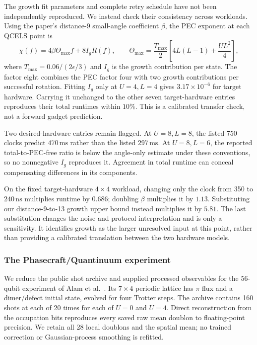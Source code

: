 \documentclass[11pt]{article}
\newcommand{\eps}{\epsilon}
\begin{document}
The growth fit parameters and complete retry schedule have not been
independently reproduced. We instead check their consistency across workloads.
Using the paper's distance-9 small-angle coefficient $\beta$, the PEC
exponent at each QCELS point is
\begin{equation}\label{eq:published-pec}
 \chi(f)=4\beta\Theta_{\max}f+8I_gR(f),\qquad
 \Theta_{\max}=\frac{T_{\max}}{2}
 \left[4L(L-1)+\frac{UL^2}{4}\right],
\end{equation}
where $T_{\max}=0.06/(2\eps/3)$ and $I_g$ is the growth contribution per
state. The factor eight combines the PEC factor four with two growth
contributions per successful rotation. Fitting $I_g$ only at $U=4,L=4$
gives $3.17\times10^{-6}$ for target hardware. Carrying it unchanged to the
other seven target-hardware entries reproduces their total runtimes within
$10\%$. This is a calibrated transfer check, not a forward gadget prediction.

Two desired-hardware entries remain flagged. At $U=8,L=8$, the listed
750 clocks predict $470\,\mathrm{ms}$ rather than the listed
$297\,\mathrm{ms}$. At $U=8,L=6$, the reported total-to-PEC-free ratio
is below the angle-only estimate under these conventions, so no nonnegative
$I_g$ reproduces it. Agreement in total runtime can conceal compensating
differences in its components.

On the fixed target-hardware $4\times4$ workload, changing only the clock
from 350 to $240\,\mathrm{ns}$ multiplies runtime by $0.686$; doubling
$\beta$ multiplies it by $1.13$. Substituting our distance-9-to-13 growth
upper bound instead multiplies it by $5.81$. The last substitution changes
the noise and protocol interpretation and is only a sensitivity. It identifies
growth as the larger unresolved input at this point, rather than providing
a calibrated translation between the two hardware models.

\subsubsection{The Phasecraft/Quantinuum experiment}
We reduce the public shot archive and supplied processed observables for the
$56$-qubit experiment of Alam et al.~\cite{alam2025,phasecraftdata2025}.
Its $7\times4$ periodic lattice has $\pi$ flux and a dimer/defect initial
state, evolved for four Trotter steps. The archive contains 160 shots at
each of 20 times for each of $U=0$ and $U=4$. Direct reconstruction from
the occupation bits reproduces every saved raw mean doublon to floating-point
precision. We retain all 28 local doublons and the spatial mean; no trained
correction or Gaussian-process smoothing is refitted.
\end{document}

